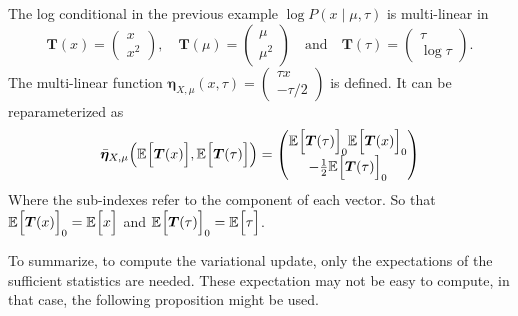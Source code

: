 \begin{exampleth}
    The log conditional in the previous example \(\log P(x \mid \mu, \tau)\) is multi-linear in
  \[
    \bm{T}(x) = \begin{pmatrix} x\\ x^{2} \end{pmatrix}, \quad \bm{T}(\mu) = \begin{pmatrix} \mu\\ \mu^{2} \end{pmatrix} \quad \text{and} \quad \bm{T}(\tau) = \begin{pmatrix} \tau\\ \log \tau \end{pmatrix}.
  \]
The multi-linear function \( \bm{\eta}_{X,\mu}(x,\tau) =  \begin{pmatrix}
            \tau x\\
            -\tau/2
          \end{pmatrix}\) is defined. It can be reparameterized as
          \[
            \bar{\bm{\eta}}_{X,\mu}\Big(\mathbb{E}_{}\Big[\bm{T}(x)\Big],\mathbb{E}_{}\Big[\bm{T}(\tau)\Big]\Big) =  \begin{pmatrix}
            \mathbb{E}_{}\Big[\bm{T}(\tau)\Big]_{0} \mathbb{E}_{}\Big[\bm{T}(x)\Big]_{0}\\
            -\frac{1}{2}\mathbb{E}_{}\Big[\bm{T}(\tau)\Big]_{0}
          \end{pmatrix}\]
        Where the sub-indexes refer to the component of each vector. So that \(  \mathbb{E}_{}\Big[\bm{T}(x)\Big]_{0} = \mathbb{E}_{}\Big[x\Big]  \) and \(  \mathbb{E}_{}\Big[\bm{T}(\tau)\Big]_{0} = \mathbb{E}_{}\Big[\tau\Big]  \).
\end{exampleth}

To summarize, to compute the variational update, only the expectations of the sufficient statistics are needed. These expectation may not be easy to compute, in that case, the following proposition might be used.

